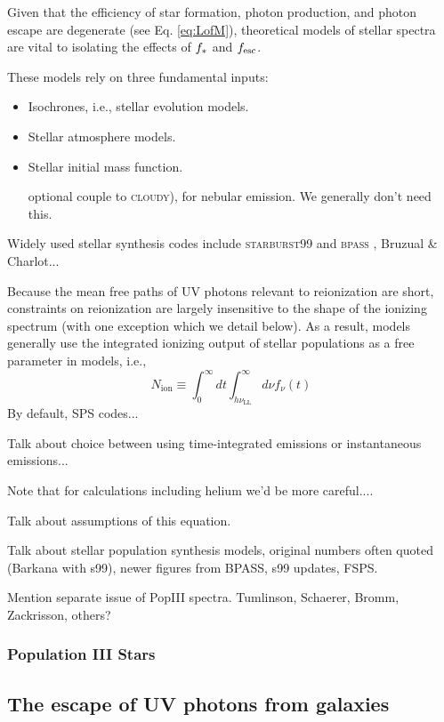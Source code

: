 Given that the efficiency of star formation, photon production, and photon escape are degenerate (see Eq. \ref{eq:LofM}), theoretical models of stellar spectra are vital to isolating the effects of $f_{\ast}$ and $f_{\text{esc}}$. 

These models rely on three fundamental inputs:
\begin{itemize}
	\item Isochrones, i.e., stellar evolution models.
	\item Stellar atmosphere models.
	\item Stellar initial mass function.
	\item [optional] couple to \textsc{cloudy}), for nebular emission. We generally don't need this.
\end{itemize}
Widely used stellar synthesis codes include \textsc{starburst99} \cite{Leitherer1999} and \textsc{bpass} \cite{Eldridge2009}, Bruzual \& Charlot...

Because the mean free paths of UV photons relevant to reionization are short, constraints on reionization are largely insensitive to the shape of the ionizing spectrum (with one exception which we detail below). As a result, models generally use the integrated ionizing output of stellar populations as a free parameter in models, i.e.,
\begin{equation}
	N_{\mathrm{ion}} \equiv \int_0^{\infty} dt \int_{h\nu_{\mathrm{LL}}}^{\infty} d\nu f_{\nu}(t)
\end{equation}
By default, SPS codes...

Talk about choice between using time-integrated emissions or instantaneous emissions...

Note that for calculations including helium we'd be more careful....

Talk about assumptions of this equation.


Talk about stellar population synthesis models, original numbers often quoted (Barkana with s99), newer figures from BPASS, s99 updates, FSPS.

Mention separate issue of PopIII spectra. Tumlinson, Schaerer, Bromm, Zackrisson, others?

\subsubsection{Population III Stars}

\subsection{The escape of UV photons from galaxies}



